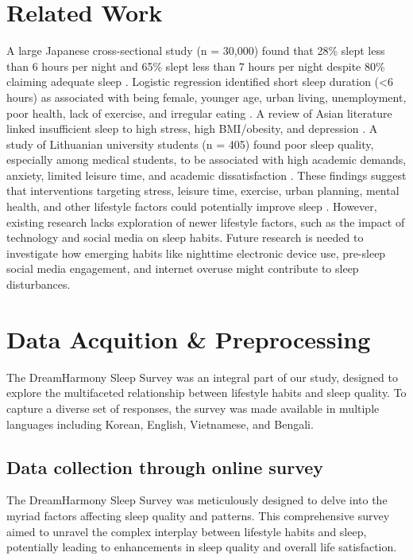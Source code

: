 \documentclass[conference]{IEEEtran}
\begin{document}
\section{Related Work}
A large Japanese cross-sectional study (n = 30,000) found that 28\% slept less than 6 hours per night and 65\% slept less than 7 hours per night despite 80\% claiming adequate sleep \cite{lifestyleinfluence}. Logistic regression identified short sleep duration (\textless 6 hours) as associated with being female, younger age, urban living, unemployment, poor health, lack of exercise, and irregular eating \cite{lifestyleinfluence}. A review of Asian literature linked insufficient sleep to high stress, high BMI/obesity, and depression \cite{immune}. A study of Lithuanian university students (n = 405) found poor sleep quality, especially among medical students, to be associated with high academic demands, anxiety, limited leisure time, and academic dissatisfaction \cite{lithua}. These findings suggest that interventions targeting stress, leisure time, exercise, urban planning, mental health, and other lifestyle factors could potentially improve sleep \cite{lifestyleinfluence,lithua}. However, existing research lacks exploration of newer lifestyle factors, such as the impact of technology and social media on sleep habits. Future research is needed to investigate how emerging habits like nighttime electronic device use, pre-sleep social media engagement, and internet overuse might contribute to sleep disturbances.

\section{Data Acquition \& Preprocessing}
The DreamHarmony Sleep Survey was an integral part of our study, designed to explore the multifaceted relationship between lifestyle habits and sleep quality. To capture a diverse set of responses, the survey was made available in multiple languages including Korean, English, Vietnamese, and Bengali.

\subsection{Data collection through online survey}
The DreamHarmony Sleep Survey was meticulously designed to delve into the myriad factors affecting sleep quality and patterns. This comprehensive survey aimed to unravel the complex interplay between lifestyle habits and sleep, potentially leading to enhancements in sleep quality and overall life satisfaction.
\end{document}
